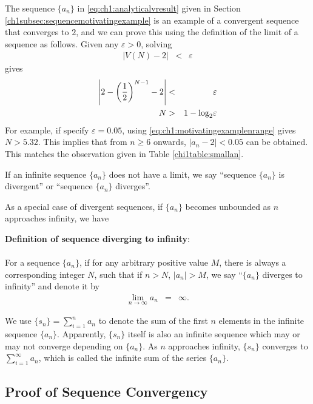 The sequence $\{a_n\}$ in \eqref{eq:ch1:analyticalvresult} given in Section \ref{ch1subsec:sequencemotivatingexample} is an example of a convergent sequence that converges to $2$, and we can prove this using the definition of the limit of a sequence as follows. Given any $\varepsilon > 0$, solving
\begin{eqnarray}
  |V(N) - 2| &<& \varepsilon \nonumber
\end{eqnarray}
gives
\begin{eqnarray}
  \left|2-\left(\frac{1}{2}\right)^{N-1}-2\right| &<& \varepsilon \nonumber \\
  N &>& 1-\textup{log}_2\varepsilon \label{eq:ch1:motivatingexamplenrange}
\end{eqnarray}
For example, if specify $\varepsilon = 0.05$, using \eqref{eq:ch1:motivatingexamplenrange} gives $N>5.32$. This implies that from $n\geq 6$ onwards, $|a_n-2|<0.05$ can be obtained. This matches the observation given in Table \ref{chi1table:smallan}.

If an infinite sequence $\{a_n\}$ does not have a limit, we say ``sequence $\{a_n\}$ is divergent'' or ``sequence $\{a_n\}$ diverges''.

As a special case of divergent sequences, if $\{a_n\}$ becomes unbounded as $n$ approaches infinity, we have
\begin{VF}
\textbf{Definition of sequence diverging to infinity}:
\\
\\
\noindent For a sequence $\{a_n\}$, if for any arbitrary positive value $M$, there is always a corresponding integer $N$, such that if $n>N$, $|a_n|>M$, we say ``$\{a_n\}$ diverges to infinity'' and denote it by
\begin{eqnarray}
  \lim_{n\rightarrow \infty}a_n &=& \infty. \nonumber
\end{eqnarray}

\end{VF}

We use $\{s_n\}=\sum_{i=1}^{n}a_n$ to denote the sum of the first $n$ elements in the infinite sequence $\{a_n\}$. Apparently, $\{s_n\}$ itself is also an infinite sequence which may or may not converge depending on $\{a_n\}$. As $n$ approaches infinity, $\{s_n\}$ converges to $\sum_{i=1}^{\infty} a_n$, which is called the infinite sum of the series $\{a_n\}$.

\subsection{Proof of Sequence Convergency} \label{chisubsec:proofofsequenceconvergency}

